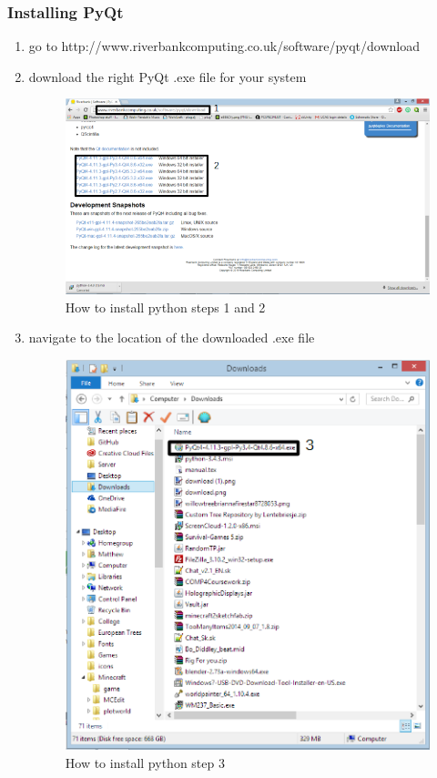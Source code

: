 \subsubsection{Installing PyQt}
\begin{enumerate}
	\item go to http://www.riverbankcomputing.co.uk/software/pyqt/download
	\item download the right PyQt .exe file for your system

\begin{figure}[H]
	\includegraphics{./manual/images/pyqt-installation-instructions-1.png}
	\caption{How to install python steps 1 and 2}
\end{figure}

	\item navigate to the location of the downloaded .exe file
	
\begin{figure}[H]
	\includegraphics{./manual/images/pyqt-installation-instructions-2.png}
	\caption{How to install python step 3}
\end{figure}


\end{enumerate}
